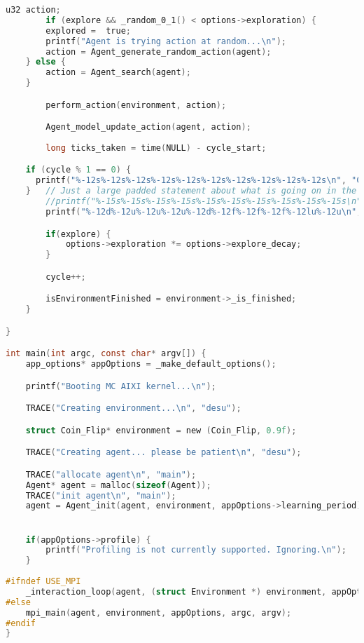 \documentclass[fancychapters]{report}   	%
\begin{document}
\begin{lstlisting}[language=C,caption={main.c}]
    	u32 action;
        if (explore && _random_0_1() < options->exploration) {
	    explored =  true;
	    printf("Agent is trying action at random...\n");
	    action = Agent_generate_random_action(agent);
	} else {
	    action = Agent_search(agent);
	}

        perform_action(environment, action);

        Agent_model_update_action(agent, action);
	
        long ticks_taken = time(NULL) - cycle_start;

	if (cycle % 1 == 0) {
	  printf("%-12s%-12s%-12s%-12s%-12s%-12s%-12s%-12s%-12s%-12s\n", "Cycle", "Observe.", "Reward", "Action", "Explored", "Exp. Rate", "Tot. Reward", "Avg Reward", "Time", "Model Size");
    }   // Just a large padded statement about what is going on in the world as we step through
        //printf("%-15s%-15s%-15s%-15s%-15s%-15s%-15s%-15s%-15s%-15s\n", "Cycle", "Observation", "Reward", "Action", "Explored", "Explore Rate", "Total Reward", "Average Reward", "Time", "Model Size");
        printf("%-12d%-12u%-12u%-12u%-12d%-12f%-12f%-12f%-12lu%-12u\n", cycle, environment->_observation, environment->_reward, action, explored, options->exploration, agent->total_reward, Agent_average_reward(agent), ticks_taken, ctw_size(agent->context_tree));

        if(explore) {
            options->exploration *= options->explore_decay;
        }

        cycle++;

        isEnvironmentFinished = environment->_is_finished;
    }

}

int main(int argc, const char* argv[]) {
    app_options* appOptions = _make_default_options();

    printf("Booting MC AIXI kernel...\n");

    TRACE("Creating environment...\n", "desu");

    struct Coin_Flip* environment = new (Coin_Flip, 0.9f);

    TRACE("Creating agent... please be patient\n", "desu");

    TRACE("allocate agent\n", "main");
    Agent* agent = malloc(sizeof(Agent));
    TRACE("init agent\n", "main");
    agent = Agent_init(agent, environment, appOptions->learning_period);


    if(appOptions->profile) {
        printf("Profiling is not currently supported. Ignoring.\n");
    }
    
#ifndef USE_MPI
    _interaction_loop(agent, (struct Environment *) environment, appOptions);
#else
    mpi_main(agent, environment, appOptions, argc, argv);
#endif
}
\end{lstlisting}
\end{document}
